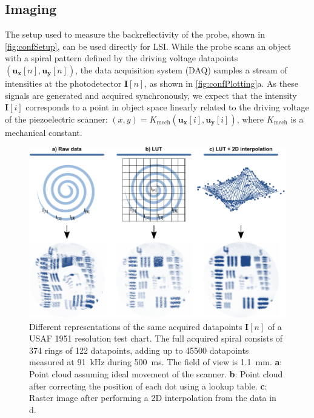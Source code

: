 \documentclass[10pt]{iopart}
\begin{document}
\subsection{Imaging}
The setup used to measure the backreflectivity of the probe, shown in \autoref{fig:confSetup}, can be used directly for LSI. While the probe scans an object with a spiral pattern defined by the driving voltage datapoints $(\mathbf{u_x}[n], \mathbf{u_y}[n])$, the data acquisition system (DAQ) samples a stream of intensities at the photodetector $\mathbf{I}[n]$, as shown in \autoref{fig:confPlotting}a. As these signals are generated and acquired synchronously, we expect that the intensity $\mathbf{I}[i]$ corresponds to a point in object space linearly related to the driving voltage of the piezoelectric scanner: $(x, y) = K_\mathrm{mech}(\mathbf{u_x}[i], \mathbf{u_y}[i])$, where $K_\mathrm{mech}$ is a mechanical constant.

\begin{figure}[h!]\centering \includegraphics[width=\columnwidth]{figures/Plotting.pdf}
      \caption{Different representations of the same acquired datapoints $\mathbf{I}[n]$ of a USAF 1951 resolution test chart. The full acquired spiral consists of 374 rings of 122 datapoints, adding up to 45500 datapoints measured at \SI{91}{\kilo\hertz} during \SI{500}{\milli\second}. The field of view is \SI{1.1}{\milli\meter}.
      \textbf{a}: Point cloud assuming ideal movement of the scanner.
      \textbf{b}: Point cloud after correcting the position of each dot using a lookup table.
      \textbf{c}: Raster image after performing a 2D interpolation from the data in d.}
      \label{fig:confPlotting}
\end{figure}
\end{document}
